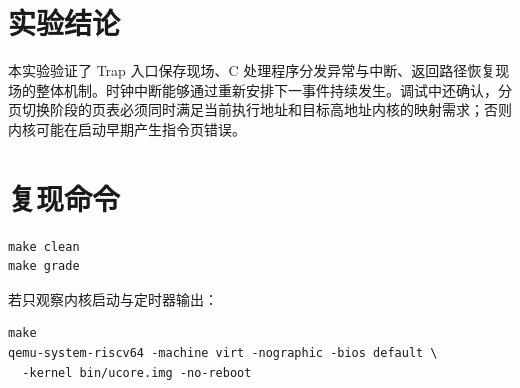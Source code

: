 \documentclass[UTF8,a4paper,12pt]{ctexart}
\begin{document}
\section{实验结论}
本实验验证了 Trap 入口保存现场、C 处理程序分发异常与中断、返回路径恢复现场的整体机制。时钟中断能够通过重新安排下一事件持续发生。调试中还确认，分页切换阶段的页表必须同时满足当前执行地址和目标高地址内核的映射需求；否则内核可能在启动早期产生指令页错误。

\section{复现命令}
\begin{lstlisting}
make clean
make grade
\end{lstlisting}
若只观察内核启动与定时器输出：
\begin{lstlisting}
make
qemu-system-riscv64 -machine virt -nographic -bios default \
  -kernel bin/ucore.img -no-reboot
\end{lstlisting}
\end{document}
